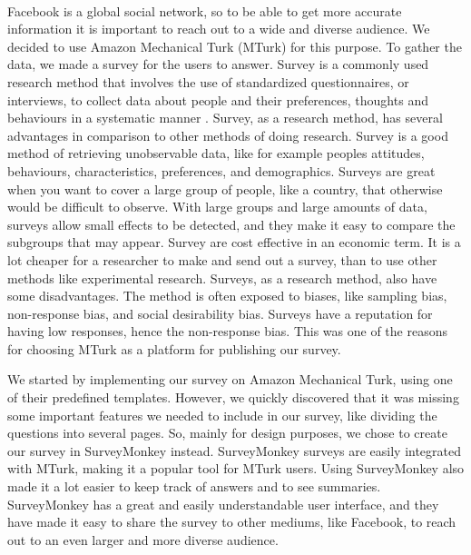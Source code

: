 \paragraph{}
Facebook is a global social network, so to be able to get more accurate information it is important to reach out to a wide and diverse audience. We decided to use Amazon Mechanical Turk (MTurk) for this purpose. To gather the data, we made a survey for the users to answer. Survey is a commonly used research method that involves the use of standardized questionnaires, or interviews, to collect data about people and their preferences, thoughts and behaviours in a systematic manner \cite{survey}. Survey, as a research method, has several advantages in comparison to other methods of doing research. Survey is a good method of retrieving unobservable data, like for example peoples attitudes, behaviours, characteristics, preferences, and demographics. Surveys are great when you want to cover a large group of people, like a country, that otherwise would be difficult to observe. With large groups and large amounts of data, surveys allow small effects to be detected, and they make it easy to compare the subgroups that may appear. Survey are cost effective in an economic term. It is a lot cheaper for a researcher to make and send out a survey, than to use other methods like experimental research. Surveys, as a research method, also have some disadvantages. The method is often exposed to biases, like sampling bias, non-response bias, and social desirability bias. Surveys have a reputation for having low responses, hence the non-response bias. This was one of the reasons for choosing MTurk as a platform for publishing our survey. 

We started by implementing our survey on Amazon Mechanical Turk, using one of their predefined templates. However, we quickly discovered that it was missing some important features we needed to include in our survey, like dividing the questions into several pages. So, mainly for design purposes, we chose to create our survey in SurveyMonkey instead. SurveyMonkey surveys are easily integrated with MTurk, making it a popular tool for MTurk users. Using SurveyMonkey also made it a lot easier to keep track of answers and to see summaries. SurveyMonkey has a great and easily understandable user interface, and they have made it easy to share the survey to other mediums, like Facebook, to reach out to an even larger and more diverse audience. 

